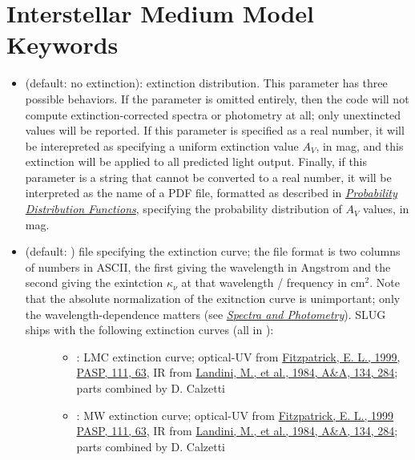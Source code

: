 \documentclass[letterpaper,10pt,english]{sphinxmanual}
\begin{document}
\section{Interstellar Medium Model Keywords}
\label{parameters:ssec-ism-keywords}\label{parameters:interstellar-medium-model-keywords}\begin{itemize}
\item {} 
 (default: no extinction): extinction distribution. This parameter has three possible behaviors. If the parameter  is omitted entirely, then the code will not compute extinction-corrected spectra or photometry at all; only unextincted values will be reported. If this parameter is specified as a real number, it will be interepreted as specifying a uniform extinction value \(A_V\), in mag, and this extinction will be applied to all predicted light output. Finally, if this parameter is a string that cannot be converted to a real number, it will be interpreted as the name of a PDF file, formatted as described in {\hyperref[pdfs:sec-pdfs]{\emph{Probability Distribution Functions}}}, specifying the probability distribution of \(A_V\) values, in mag.

\item {} \begin{description}
\item[{ (default: ) file specifying the extinction curve; the file format is two columns of numbers in ASCII, the first giving the wavelength in Angstrom and the second giving the exintction \(\kappa_\nu\) at that wavelength / frequency in \(\mathrm{cm}^2\). Note that the absolute normalization of the exitnction curve is unimportant; only the wavelength-dependence matters (see {\hyperref[intro:ssec-spec-phot]{\emph{Spectra and Photometry}}}). SLUG ships with the following extinction curves (all in ):}] \leavevmode\begin{itemize}
\item {} 
 : LMC extinction curve; optical-UV from \href{http://adsabs.harvard.edu/abs/1999PASP..111...63F}{Fitzpatrick, E. L., 1999, PASP, 111, 63}, IR from \href{http://adsabs.harvard.edu/abs/1984A\%26A...134..284L}{Landini, M., et al., 1984, A\&A, 134, 284}; parts combined by D. Calzetti

\item {} 
 : MW extinction curve; optical-UV from \href{http://adsabs.harvard.edu/abs/1999PASP..111...63F}{Fitzpatrick, E. L., 1999 PASP, 111, 63}, IR from \href{http://adsabs.harvard.edu/abs/1984A\%26A...134..284L}{Landini, M., et al., 1984, A\&A, 134, 284}; parts combined by D. Calzetti


\end{itemize}
\end{description}
\end{itemize}
\end{document}
